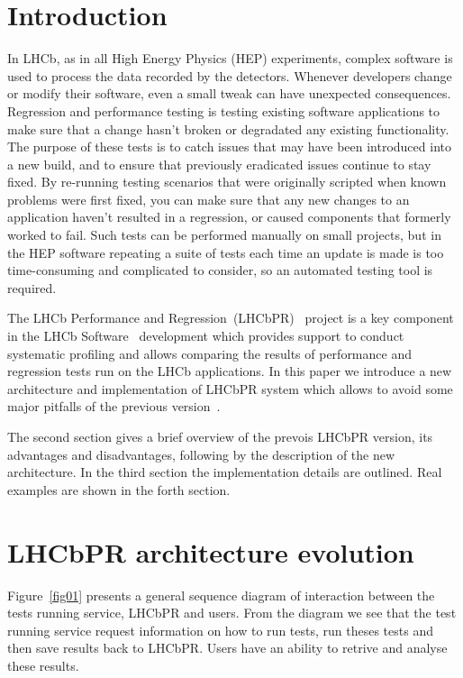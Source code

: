 \documentclass[a4paper]{jpconf}
\begin{document}
\section{Introduction}

In LHCb, as in all High Energy Physics (HEP) experiments, complex software is
used to process the data recorded by the detectors. Whenever developers change
or modify their software, even a small tweak can have unexpected
consequences. Regression and performance testing is testing existing software
applications to make sure that a change hasn't broken or degradated any existing
functionality. The purpose of these tests is to catch issues that may have been
introduced into a new build, and to ensure that previously eradicated issues
continue to stay fixed. By re-running testing scenarios that were originally
scripted when known problems were first fixed, you can make sure that any new
changes to an application haven't resulted in a regression, or caused components
that formerly worked to fail. Such tests can be performed manually on small
projects, but in the HEP software repeating a suite of tests each time an update
is made is too time-consuming and complicated to consider, so an automated
testing tool is required. 

The LHCb Performance and Regression~(LHCbPR)~\cite{lhcbpr}  project is a key
component in the LHCb Software~\cite{lhcbsoft} development which provides support to conduct
systematic profiling and allows comparing the results of performance
and regression tests run on the LHCb applications. In this paper we introduce
a new architecture and implementation of LHCbPR system which allows to avoid
some major pitfalls of the previous version~\cite{lhcbpr}.

The second section gives a brief overview of the prevois LHCbPR version,
its advantages and disadvantages, following by the description of the
new architecture. In the third section the implementation details are outlined.
Real examples are shown in the forth section.

\section{LHCbPR architecture evolution}

Figure~\ref{fig01} presents a general sequence diagram of interaction between
the tests running service, LHCbPR  and users. From the diagram we see that the
test running service request information on how to run tests, run theses tests
and then save results back to LHCbPR. Users have an ability to retrive and
analyse these results.
\end{document}
